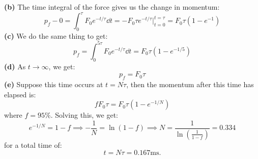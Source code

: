 \documentclass{article}
\begin{document}
\noindent \textbf{(b)} The time integral of the force gives us the change in momentum:
\begin{equation}
    p_f - 0 = \int_0^\tau F_0 e^{-t/\tau} \dd{t} = -F_0\tau e^{-t/\tau}\Big|^{t=\tau}_{t=0} = F_0\tau \left(1-e^{-1}\right)
    \label{eq:}
\end{equation}
\noindent \textbf{(c)} We do the same thing to get:
\begin{equation}
    p_f = \int_0^{5\tau} F_0e^{-t/\tau}\dd{t} = F_0\tau\left(1-e^{-1/5}\right)
    \label{eq:}
\end{equation}
\textbf{(d)} As $t\to\infty$, we get:
\begin{equation}
    p_f = F_0\tau
    \label{eq:}
\end{equation}
\textbf{(e)} Suppose this time occurs at $t=N\tau$, then the momentum after this time has elapsed is:
\begin{equation}
    fF_0\tau = F_0\tau\left(1-e^{-1/N}\right)
    \label{eq:}
\end{equation}
where $f=95\%$. Solving this, we get:
\begin{equation}
    e^{-1/N} = 1-f \implies -\frac{1}{N} = \ln(1-f) \implies N = \frac{1}{\ln\left(\frac{1}{1-f}\right)}=0.334
    \label{eq:}
\end{equation}
for a total time of:
\begin{equation}
    t=N\tau = 0.167\si{\milli\second}.
    \label{eq:}
\end{equation}
\end{document}
